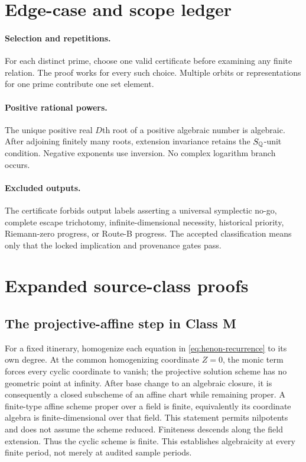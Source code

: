 \documentclass[11pt]{article}
\theoremstyle{definition}
\theoremstyle{remark}
\begin{document}
\appendix

\section{Edge-case and scope ledger}
\label{app:scope}

\paragraph{Selection and repetitions.}
For each distinct prime, choose one valid certificate before examining any
finite relation.  The proof works for every such choice.  Multiple orbits or
representations for one prime contribute one set element.

\paragraph{Positive rational powers.}
The unique positive real $D$th root of a positive algebraic number is
algebraic.  After adjoining finitely many roots, extension invariance retains
the $S_{\mathbb Q}$-unit condition.  Negative exponents use inversion.  No complex
logarithm branch occurs.

\paragraph{Excluded outputs.}
The certificate forbids output labels asserting a universal symplectic
no-go, complete escape trichotomy, infinite-dimensional necessity, historical
priority, Riemann-zero progress, or Route-B progress.  The accepted
classification means only that the locked implication and provenance gates
pass.

\section{Expanded source-class proofs}
\label{app:sources}

\subsection{The projective-affine step in Class M}

For a fixed itinerary, homogenize each equation in
\eqref{eq:henon-recurrence} to its own degree.  At the common homogenizing
coordinate $Z=0$, the monic term forces every cyclic coordinate to vanish;
the projective solution scheme has no geometric point at infinity.  After
base change to an algebraic closure, it is consequently a closed subscheme of
an affine chart while remaining proper.  A finite-type affine scheme proper
over a field is finite, equivalently its coordinate algebra is
finite-dimensional over that field.  This statement permits nilpotents and
does not assume the scheme reduced.  Finiteness descends along the field
extension.  Thus the cyclic scheme is finite.  This establishes algebraicity
at every finite period, not merely at audited sample periods.
\end{document}
